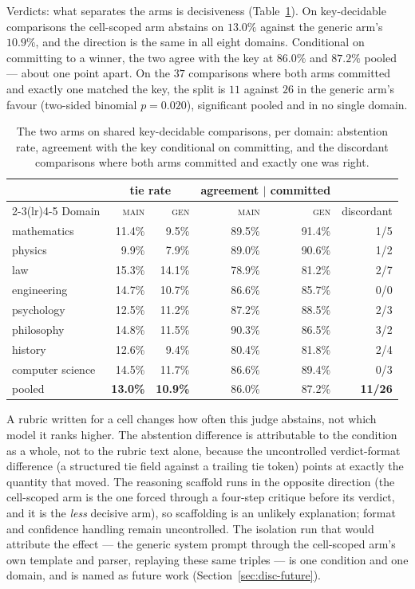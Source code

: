 Verdicts: what separates the arms is decisiveness
(Table~\ref{tab:c5-decisiveness}). On key-decidable comparisons the
cell-scoped arm abstains on $13.0\%$ against the generic arm's
$10.9\%$, and the direction is the same in all eight domains.
Conditional on committing to a winner, the two agree with the key at
$86.0\%$ and $87.2\%$ pooled --- about one point apart. On the $37$
comparisons where both arms committed and exactly one matched the
key, the split is $11$ against $26$ in the generic arm's favour
(two-sided binomial $p = 0.020$), significant pooled and in no single
domain.

\begin{table}[htbp]
\centering
\caption{The two arms on shared key-decidable comparisons, per
domain: abstention rate, agreement with the key conditional on
committing, and the discordant comparisons where both arms committed
and exactly one was right.}
\label{tab:c5-decisiveness}
\begin{tabular}{lrrrrr}
\toprule
& \multicolumn{2}{c}{tie rate} & \multicolumn{2}{c}{agreement $\mid$ committed} & \\
\cmidrule(lr){2-3}\cmidrule(lr){4-5}
Domain & \textsc{main} & \textsc{gen} & \textsc{main} & \textsc{gen} & discordant \\
\midrule
mathematics      & 11.4\% &  9.5\% & 89.5\% & 91.4\% & 1/5 \\
physics          &  9.9\% &  7.9\% & 89.0\% & 90.6\% & 1/2 \\
law              & 15.3\% & 14.1\% & 78.9\% & 81.2\% & 2/7 \\
engineering      & 14.7\% & 10.7\% & 86.6\% & 85.7\% & 0/0 \\
psychology       & 12.5\% & 11.2\% & 87.2\% & 88.5\% & 2/3 \\
philosophy       & 14.8\% & 11.5\% & 90.3\% & 86.5\% & 3/2 \\
history          & 12.6\% &  9.4\% & 80.4\% & 81.8\% & 2/4 \\
computer science & 14.5\% & 11.7\% & 86.6\% & 89.4\% & 0/3 \\
\midrule
pooled           & \textbf{13.0\%} & \textbf{10.9\%} & 86.0\% & 87.2\% & \textbf{11/26} \\
\bottomrule
\end{tabular}
\end{table}

A rubric written for a cell changes how often this
judge abstains, not which model it ranks higher. The abstention
difference is attributable to the condition as a whole, not to the
rubric text alone, because the uncontrolled verdict-format difference
(a structured tie field against a trailing tie token) points at
exactly the quantity that moved. The reasoning scaffold runs in the
opposite direction (the cell-scoped arm is the one forced through a
four-step critique before its verdict, and it is the \emph{less}
decisive arm), so scaffolding is an unlikely explanation; format and
confidence handling remain uncontrolled. The isolation run that would
attribute the effect --- the generic system prompt through the
cell-scoped arm's own template and parser, replaying these same
triples --- is one condition and one domain, and is named as future
work (Section~\ref{sec:disc-future}).


